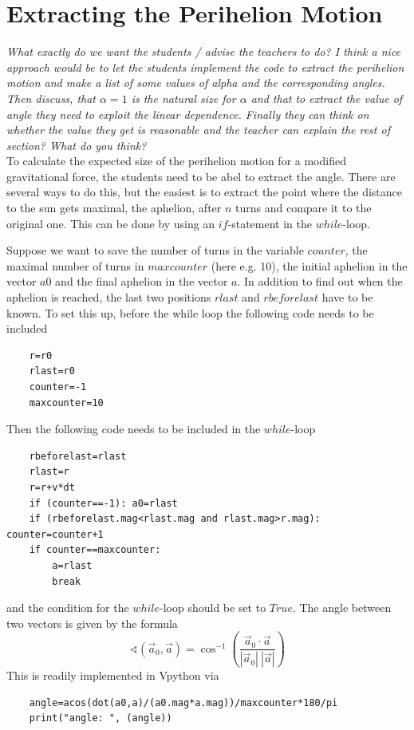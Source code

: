 \documentclass[12pt]{iopart}
\begin{document}
\section{Extracting the Perihelion Motion}

\textit{What exactly do we want the students / advise the teachers to do? I think a nice approach would be to let the students implement the code to extract the perihelion motion and make a list of some values of alpha and the corresponding angles. Then discuss, that $\alpha=1$ is the natural size for $\alpha$ and that to extract the value of angle they need to exploit the linear dependence. Finally they can think on whether the value they get is reasonable and the teacher can explain the rest of section? What do you think?}\\

To calculate the expected size of the perihelion motion for a modified gravitational force, the students need to be abel to extract the angle. There are several ways to do this, but the easiest is to extract the point where the distance to the sun gets maximal, the aphelion, after $n$ turns and compare it to the original one. This can be done by using an $if$-statement in the $while$-loop.

Suppose we want to save the number of turns in the variable $counter$, the maximal number of turns in $maxcounter$ (here e.g. 10), the initial aphelion in the vector $a0$ and the final aphelion in the vector $a$. In addition to find out when the aphelion is reached, the last two positions $rlast$ and $rbeforelast$ have to be known. To set this up, before the while loop the following code needs to be included
\begin{lstlisting}
	r=r0
	rlast=r0
	counter=-1
	maxcounter=10
\end{lstlisting}
Then the following code needs to be included in the $while$-loop
\begin{lstlisting}
    rbeforelast=rlast
    rlast=r
    r=r+v*dt
    if (counter==-1): a0=rlast
    if (rbeforelast.mag<rlast.mag and rlast.mag>r.mag): counter=counter+1
    if counter==maxcounter:
    	a=rlast
    	break
\end{lstlisting}
and the condition for the $while$-loop should be set to $True$.
The angle between two vectors is given by the formula
 \begin{equation}
 	\sphericalangle(\vec{a}_0,\vec{a}) = \cos^{-1} \left( \frac{\vec{a}_0 \cdot \vec{a}}{|\vec{a}_0|\:|\vec{a}|} \right)
 \end{equation}
This is readily implemented in Vpython via
\begin{lstlisting}
	angle=acos(dot(a0,a)/(a0.mag*a.mag))/maxcounter*180/pi
	print("angle: ", (angle))
\end{lstlisting}
\end{document}
